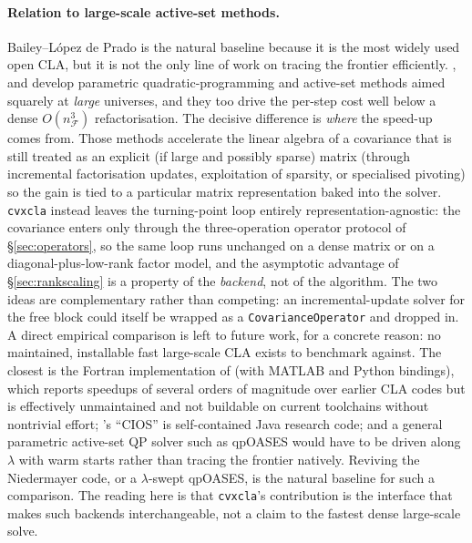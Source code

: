 \documentclass[11pt]{article}
\newcommand{\F}{\mathcal{F}}        %
\begin{document}
\paragraph{Relation to large-scale active-set methods.}
Bailey--L\'opez de Prado is the natural baseline because it is the most widely
used open CLA, but it is not the only line of work on tracing the frontier
efficiently. \citet{perold1984}, \citet{stein2008} and \citet{hirschberger2010}
develop parametric quadratic-programming and active-set methods aimed squarely at
\emph{large} universes, and they too drive the per-step cost well below a dense
$O(n_\F^3)$ refactorisation. The decisive difference is \emph{where} the speed-up
comes from. Those methods accelerate the linear algebra of a covariance that is
still treated as an explicit (if large and possibly sparse) matrix (through
incremental factorisation updates, exploitation of sparsity, or specialised
pivoting) so the gain is tied to a particular matrix representation baked into
the solver. \texttt{cvxcla} instead leaves the turning-point loop entirely
representation-agnostic: the covariance enters only through the three-operation
operator protocol of \S\ref{sec:operators}, so the same loop runs unchanged on a
dense matrix or on a diagonal-plus-low-rank factor model, and the asymptotic
advantage of \S\ref{sec:rankscaling} is a property of the \emph{backend}, not of
the algorithm. The two ideas are complementary rather than competing: an
incremental-update solver for the free block could itself be wrapped as a
\texttt{CovarianceOperator} and dropped in. A direct empirical comparison is left
to future work, for a concrete reason: no maintained, installable fast large-scale
CLA exists to benchmark against. The closest is the Fortran implementation of
\citet{niedermayer2010} (with MATLAB and Python bindings), which reports speedups
of several orders of magnitude over earlier CLA codes but is effectively
unmaintained and not buildable on current toolchains without nontrivial effort;
\citet{hirschberger2010}'s ``CIOS'' is self-contained Java research code; and a
general parametric active-set QP solver such as qpOASES would have to be driven
along $\lambda$ with warm starts rather than tracing the frontier natively.
Reviving the Niedermayer code, or a $\lambda$-swept qpOASES, is the natural
baseline for such a comparison. The reading here is that \texttt{cvxcla}'s
contribution is the interface that makes such backends interchangeable, not a
claim to the fastest dense large-scale solve.
\end{document}
